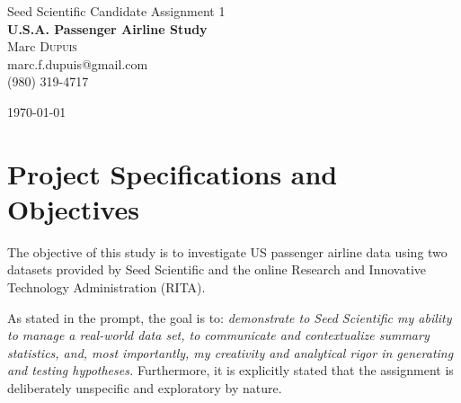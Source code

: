 \documentclass[11pt,twoside,titlepage]{article}
\begin{document}
%
%

\setcounter{page}{0}

\begin{titlepage}
\begin{center}

\vspace*{4cm}
\Large Seed Scientific Candidate Assignment 1\\[0.5cm]


{ \huge \bfseries U.S.A. Passenger Airline Study}\\[0.4cm]

Marc \textsc{Dupuis}\\
\small marc.f.dupuis@gmail.com\\
\small (980) 319-4717

\vfill

{\large \today}

\end{center}
\end{titlepage}

\section{Project Specifications and Objectives}

The objective of this study is to investigate US passenger airline data using two datasets provided by Seed Scientific and the online Research and Innovative Technology Administration (RITA).

As stated in the prompt, the goal is to: \textit{demonstrate to Seed Scientific my ability to manage a real-world data set, to communicate and contextualize summary statistics, and, most importantly, my creativity and analytical rigor in generating and testing hypotheses.} Furthermore, it is explicitly stated that the assignment is deliberately unspecific and exploratory by nature.
\end{document}
